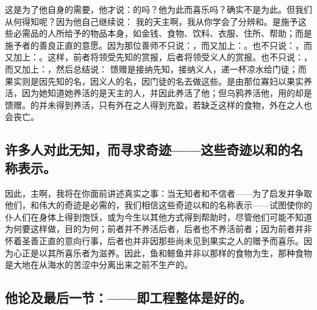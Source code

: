 这是为了他自身的需要，他才说：的吗？他为此而喜乐吗？确实不是为此。但我们从何得知呢？因为他自己继续说： 我的天主啊，我从你学会了分辨和。是施予这些必需品的人所给予的物品本身，如金钱、食物、饮料、衣服、住所、帮助；而是施予者的善良正直的意愿。因为那位善师不只说：，而又加上：。也不只说：，而又加上：。这样，前者将领受先知的赏报，后者将领受义人的赏报。也不只说：，而又加上：，然后总结说： 馈赠是接纳先知，接纳义人，递一杯凉水给门徒；而果实则是因先知的名，因义人的名，因门徒的名去做这些。是由那位寡妇以果实养活，因为她知道她养活的是天主的人，并因此养活了他；但乌鸦养活他，用的却是馈赠。的并未得到养活，只有外在之人得到充盈，若缺乏这样的食物，外在之人也会丧亡。\par


\subsection{许多人对此无知，而寻求奇迹——这些奇迹以和的名称表示。}

因此，主啊，我将在你面前讲述真实之事：当无知者和不信者——为了启发并争取他们，和伟大的奇迹是必需的，我们相信这些奇迹以和的名称表示——试图使你的仆人们在身体上得到饱饫，或为今生以其他方式得到帮助时，尽管他们可能不知道为何要这样做，目的为何；前者并不养活后者，后者也不养活前者；因为前者并非怀着圣善正直的意向行事，后者也并非因那些尚未见到果实之人的赠予而喜乐。因为心正是以其所喜乐者为滋养。因此，鱼和鲸鱼并非以那样的食物为生，那种食物是大地在从海水的苦涩中分离出来之前不生产的。\par


\subsection{他论及最后一节：——即工程整体是好的。}


